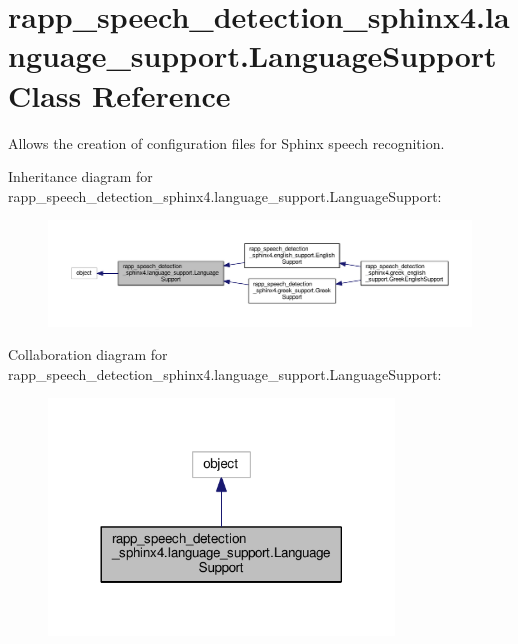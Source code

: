 \hypertarget{classrapp__speech__detection__sphinx4_1_1language__support_1_1LanguageSupport}{\section{rapp\-\_\-speech\-\_\-detection\-\_\-sphinx4.\-language\-\_\-support.\-Language\-Support Class Reference}
\label{classrapp__speech__detection__sphinx4_1_1language__support_1_1LanguageSupport}
}


Allows the creation of configuration files for Sphinx speech recognition.  




Inheritance diagram for rapp\-\_\-speech\-\_\-detection\-\_\-sphinx4.\-language\-\_\-support.\-Language\-Support\-:
\nopagebreak
\begin{figure}[H]
\begin{center}
\leavevmode
\includegraphics[width=350pt]{classrapp__speech__detection__sphinx4_1_1language__support_1_1LanguageSupport__inherit__graph}
\end{center}
\end{figure}


Collaboration diagram for rapp\-\_\-speech\-\_\-detection\-\_\-sphinx4.\-language\-\_\-support.\-Language\-Support\-:
\nopagebreak
\begin{figure}[H]
\begin{center}
\leavevmode
\includegraphics[width=260pt]{classrapp__speech__detection__sphinx4_1_1language__support_1_1LanguageSupport__coll__graph}
\end{center}
\end{figure}
